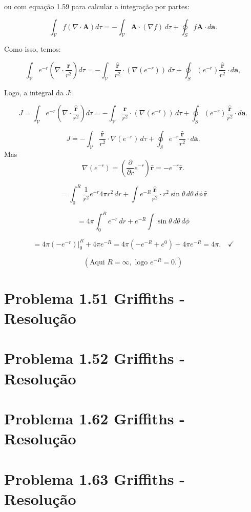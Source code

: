 \documentclass[a4paper,12pt]{article}
\newcommand{\printingbibliography}{%

    \pagestyle{myheadings}
    \markright{}
    \sloppy
    \printbibliography[heading=bibintoc, %
                   title=Refer\^encias %
                  ]
    \fussy%
}
\begin{document}
ou com equação 1.59 para calcular a integra\c{c}\~ao por partes:

\begin{equation}
\int_{\mathcal{V}} f \left( \nabla \cdot \mathbf{A} \right) d\tau = -\int_{\mathcal{V}}\mathbf{A} \cdot (\nabla f)\, d\tau + \oint_S f \mathbf{A} \cdot d\mathbf{a}.
\end{equation}

Como isso, temos:

\begin{equation}
    \int_{\mathcal{V}} e^{-r} \left( \nabla \cdot \frac{\hat{\mathbf{r}}}{r^2} \right) d\tau = -\int_{\mathcal{V}}\frac{\hat{\mathbf{r}}}{r^2} \cdot (\nabla (e^{-r}))\, d\tau + \oint_S (e^{-r}) \frac{\hat{\mathbf{r}}}{r^2} \cdot d\mathbf{a},
\end{equation}

Logo, a integral da $J$:

\begin{equation}
    J = \int_{\mathcal{V}} e^{-r} \left( \nabla \cdot \frac{\hat{\mathbf{r}}}{r^2} \right) d\tau = -\int_{\mathcal{V}}\frac{\hat{\mathbf{r}}}{r^2} \cdot (\nabla (e^{-r}))\, d\tau + \oint_S (e^{-r}) \frac{\hat{\mathbf{r}}}{r^2} \cdot d\mathbf{a}.
\end{equation}

\[
J = -\int_{\mathcal{V}} \frac{\hat{\mathbf{r}}}{r^2} \cdot \nabla (e^{-r}) \, d\tau + \oint_{\mathcal{S}} e^{-r} \frac{\hat{\mathbf{r}}}{r^2} \cdot d\mathbf{a}.
\]
Mas 
\[
\nabla (e^{-r}) = \left( \frac{\partial}{\partial r} e^{-r} \right) \hat{\mathbf{r}} = -e^{-r} \hat{\mathbf{r}}.
\]

\[
= \int_0^R \frac{1}{r^2} e^{-r} 4\pi r^2 \, dr + \int e^{-R} \frac{\hat{\mathbf{r}}}{r^2} \cdot r^2 \sin\theta \, d\theta \, d\phi \, \hat{\mathbf{r}}
\]

\[
= 4\pi \int_0^R e^{-r} \, dr + e^{-R} \int \sin\theta \, d\theta \, d\phi
\]

\[
= 4\pi \left( -e^{-r} \right) \Big|_0^R + 4\pi e^{-R} = 4\pi (-e^{-R} + e^{0}) + 4\pi e^{-R} = 4\pi. \quad \checkmark
\]

\[
(\text{Aqui } R = \infty, \text{ logo } e^{-R} = 0.)
\]


\section*{Problema 1.51 Griffiths - Resolu\c{c}\~ao}

\section*{Problema 1.52 Griffiths - Resolu\c{c}\~ao}

\section*{Problema 1.62 Griffiths - Resolu\c{c}\~ao}

\section*{Problema 1.63 Griffiths - Resolu\c{c}\~ao}

\end{document}
